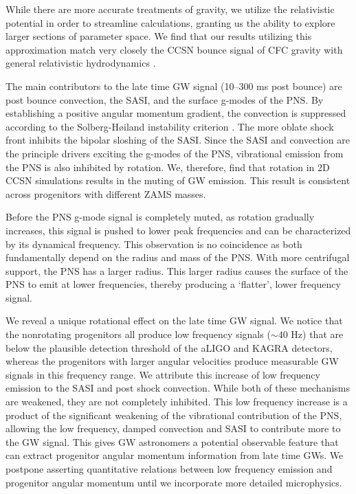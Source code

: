 \documentclass[twocolumn,times]{aastex62}  %
\begin{document}
While there are more accurate treatments of gravity, we utilize the relativistic potential in order to streamline calculations, granting us the ability to explore larger sections of parameter space. 
We find that our results utilizing this approximation match very closely the CCSN bounce signal of CFC gravity with general relativistic hydrodynamics \citep{richers:2017}.  

The main contributors to the late time GW signal (10--300 ms post bounce) are post bounce convection, the SASI, and the surface g-modes of the PNS.  By establishing a positive angular momentum gradient, the convection is suppressed according to the Solberg-H{\o}iland instability criterion \citep{endal:1978,fryer:2000}.  The more oblate shock front inhibits the bipolar sloshing of the SASI.  Since the SASI and convection are the principle drivers exciting the g-modes of the PNS, vibrational emission from the PNS is also inhibited by rotation.  
We, therefore, find that rotation in 2D CCSN simulations results in the muting of GW emission.
This result is consistent across progenitors with different ZAMS masses. 

Before the PNS g-mode signal is completely muted, as rotation gradually increases, this signal is pushed to lower peak frequencies and can be characterized by its dynamical frequency.  This observation is no coincidence as both  fundamentally depend on the radius and mass of the PNS.  With more centrifugal support, the PNS has a larger radius.  This larger radius causes the surface of the PNS to emit at lower frequencies, thereby producing a `flatter', lower frequency signal.

We reveal a unique rotational effect on the late time GW signal.  We notice that the nonrotating progenitors all produce low frequency signals ($\sim 40$ Hz) that are below the plausible detection threshold of the aLIGO and KAGRA detectors, whereas the progenitors with larger angular velocities produce measurable GW signals in this frequency range.  We attribute this increase of low frequency emission to the SASI and post shock convection.  While both of these mechanisms are weakened, they are not completely inhibited.  This low frequency increase is a product of the significant weakening of the vibrational contribution of the PNS, allowing the low frequency, damped convection and SASI to contribute more to the GW signal. 
This gives GW astronomers a potential observable feature that can extract progenitor angular momentum information from late time GWs.  We postpone asserting quantitative relations between low frequency emission and progenitor angular momentum until we incorporate more detailed microphysics.
\end{document}
